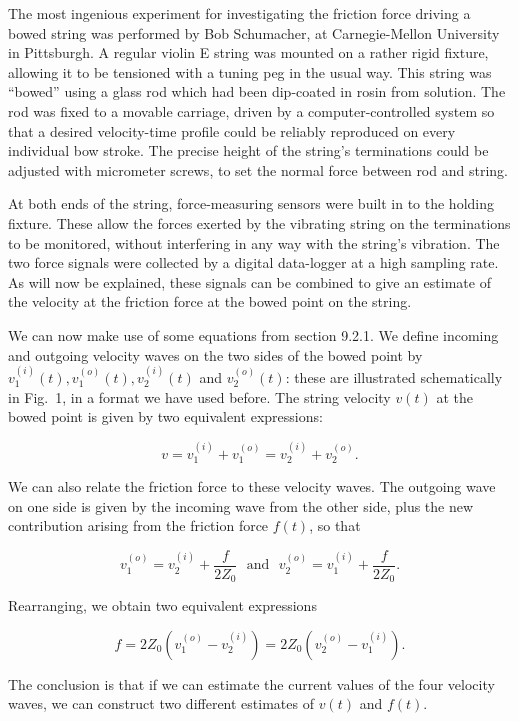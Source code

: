   The most ingenious experiment for investigating the friction force driving a 
  bowed string was performed by Bob Schumacher, at Carnegie-Mellon University 
  in Pittsburgh. A regular violin E string was mounted on a rather rigid 
  fixture, allowing it to be tensioned with a tuning peg in the usual way. This 
  string was ``bowed'' using a glass rod which had been dip-coated in rosin 
  from solution. The rod was fixed to a movable carriage, driven by a 
  computer-controlled system so that a desired velocity-time profile could be 
  reliably reproduced on every individual bow stroke. The precise height of the 
  string's terminations could be adjusted with micrometer screws, to set the 
  normal force between rod and string. 

  At both ends of the string, force-measuring sensors were built in to the 
  holding fixture. These allow the forces exerted by the vibrating string on 
  the terminations to be monitored, without interfering in any way with the 
  string's vibration. The two force signals were collected by a digital 
  data-logger at a high sampling rate. As will now be explained, these signals 
  can be combined to give an estimate of the velocity at the friction force at 
  the bowed point on the string. 

  We can now make use of some equations from section 9.2.1. We define incoming 
  and outgoing velocity waves on the two sides of the bowed point by 
  $v_1^{(i)}(t), v_1^{(o)}(t), v_2^{(i)}(t)$ and $v_2^{(o)}(t)$: these are 
  illustrated schematically in Fig.\ 1, in a format we have used before. The 
  string velocity $v(t)$ at the bowed point is given by two equivalent 
  expressions: 

  $$v=v_1^{(i)}+v_1^{(o)}=v_2^{(i)}+v_2^{(o)} . \tag{1}$$ 

  We can also relate the friction force to these velocity waves. The outgoing 
  wave on one side is given by the incoming wave from the other side, plus the 
  new contribution arising from the friction force $f(t)$, so that 

  $$v_1^{(o)} = v_2^{(i)} + \dfrac{f}{2Z_0} \mathrm{~~~ and~~~} v_2^{(o)} = 
  v_1^{(i)} + \dfrac{f}{2Z_0} . \tag{2}$$ 

  Rearranging, we obtain two equivalent expressions 

  $$f=2Z_0(v_1^{(o)}-v_2^{(i)})=2Z_0(v_2^{(o)}-v_1^{(i)}). \tag{3}$$ 

  The conclusion is that if we can estimate the current values of the four 
  velocity waves, we can construct two different estimates of $v(t)$ and 
  $f(t)$. 

